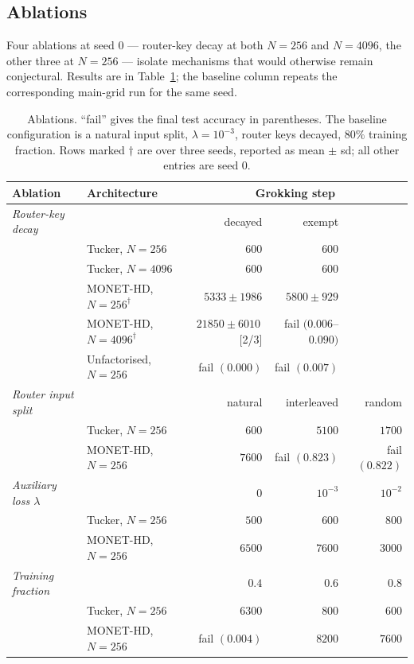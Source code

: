 \subsection{Ablations}
\label{sec:res-ablations}

Four ablations at seed $0$ --- router-key decay at both $N = 256$ and
$N = 4096$, the other three at $N = 256$ --- isolate mechanisms that
would otherwise remain conjectural. Results are in Table~\ref{tab:ablations};
the baseline column repeats the corresponding main-grid run for the same seed.

\begin{table}[ht]
\centering
\caption{Ablations. ``fail'' gives the final test accuracy in parentheses. The
baseline configuration is a natural input split, $\lambda = 10^{-3}$, router
keys decayed, $80\%$ training fraction. Rows marked $\dagger$ are over three
seeds, reported as mean $\pm$ sd; all other entries are seed $0$.}
\label{tab:ablations}
\footnotesize
\begin{tabular}{llrrr}
\toprule
Ablation & Architecture & \multicolumn{3}{c}{Grokking step} \\
\midrule
\emph{Router-key decay} & & decayed & exempt & \\
& Tucker, $N{=}256$       & $600$  & $600$ & \\
& Tucker, $N{=}4096$      & $600$  & $600$ & \\
& MONET-HD, $N{=}256^\dagger$  & $5333 \pm 1986$ & $5800 \pm 929$ & \\
& MONET-HD, $N{=}4096^\dagger$ & $21850 \pm 6010$\,[2/3] & fail $(0.006$--$0.090)$ & \\
& Unfactorised, $N{=}256$ & fail $(0.000)$ & fail $(0.007)$ & \\
\midrule
\emph{Router input split} & & natural & interleaved & random \\
& Tucker, $N{=}256$   & $600$  & $5100$ & $1700$ \\
& MONET-HD, $N{=}256$ & $7600$ & fail $(0.823)$ & fail $(0.822)$ \\
\midrule
\emph{Auxiliary loss $\lambda$} & & $0$ & $10^{-3}$ & $10^{-2}$ \\
& Tucker, $N{=}256$   & $500$  & $600$  & $800$ \\
& MONET-HD, $N{=}256$ & $6500$ & $7600$ & $3000$ \\
\midrule
\emph{Training fraction} & & $0.4$ & $0.6$ & $0.8$ \\
& Tucker, $N{=}256$   & $6300$ & $800$  & $600$ \\
& MONET-HD, $N{=}256$ & fail $(0.004)$ & $8200$ & $7600$ \\
\bottomrule
\end{tabular}
\end{table}

